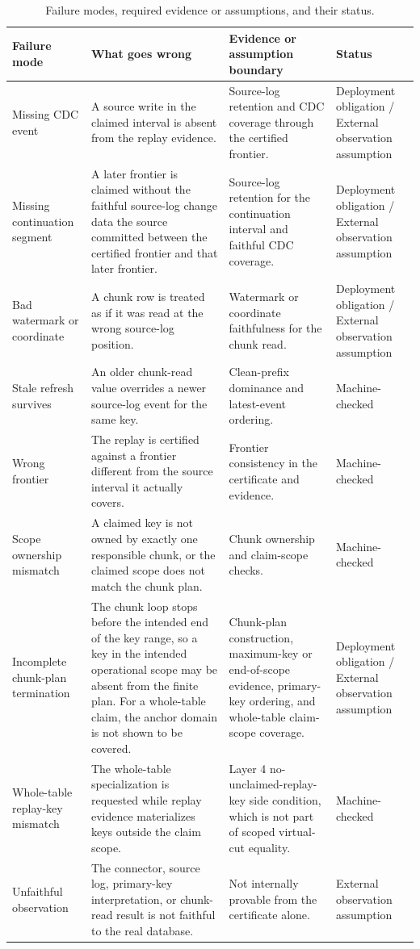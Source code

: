 \documentclass[letterpaper,10pt,twocolumn]{article}
\begin{document}
\begin{table}[t]
\caption{Failure modes, required evidence or assumptions, and their
status.}
\label{tab:failure-modes}
\centering\small
\begin{tabularx}{\textwidth}{@{}p{1.55in}YYY@{}}
\toprule
\textbf{Failure mode} & \textbf{What goes wrong} &
\textbf{Evidence or assumption boundary} & \textbf{Status}\\
\midrule
Missing CDC event &
  A source write in the claimed interval is absent from the replay
  evidence. &
  Source-log retention and CDC coverage through the certified
  frontier. &
  Deployment obligation / External observation assumption\\
Missing continuation segment &
  A later frontier is claimed without the faithful source-log change
  data the source committed between the certified frontier and that
  later frontier. &
  Source-log retention for the continuation interval and faithful CDC
  coverage. &
  Deployment obligation / External observation assumption\\
Bad watermark or coordinate &
  A chunk row is treated as if it was read at the wrong source-log
  position. &
  Watermark or coordinate faithfulness for the chunk read. &
  Deployment obligation / External observation assumption\\
Stale refresh survives &
  An older chunk-read value overrides a newer source-log event for
  the same key. &
  Clean-prefix dominance and latest-event ordering. &
  Machine-checked\\
Wrong frontier &
  The replay is certified against a frontier different from the
  source interval it actually covers. &
  Frontier consistency in the certificate and evidence. &
  Machine-checked\\
Scope ownership mismatch &
  A claimed key is not owned by exactly one responsible chunk, or the
  claimed scope does not match the chunk plan. &
  Chunk ownership and claim-scope checks. &
  Machine-checked\\
Incomplete chunk-plan termination &
  The chunk loop stops before the intended end of the key range, so a
  key in the intended operational scope may be absent from the finite
  plan. For a whole-table claim, the anchor domain is not shown to be
  covered. &
  Chunk-plan construction, maximum-key or end-of-scope evidence,
  primary-key ordering, and whole-table claim-scope coverage. &
  Deployment obligation / External observation assumption\\
Whole-table replay-key mismatch &
  The whole-table specialization is requested while replay evidence
  materializes keys outside the claim scope. &
  Layer 4 no-unclaimed-replay-key side condition, which is not part of scoped
  virtual-cut equality. &
  Machine-checked\\
Unfaithful observation &
  The connector, source log, primary-key interpretation, or
  chunk-read result is not faithful to the real database. &
  Not internally provable from the certificate alone. &
  External observation assumption\\
\bottomrule
\end{tabularx}
\end{table}
\end{document}
